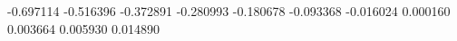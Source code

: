 -0.697114
-0.516396
-0.372891
-0.280993
-0.180678
-0.093368
-0.016024
0.000160
0.003664
0.005930
0.014890
